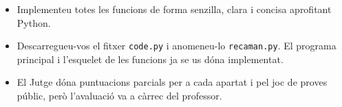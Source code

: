 \Observations

\begin{itemize}

\item Implementeu totes les funcions de forma senzilla, clara i concisa aprofitant Python.

\item Descarregueu-vos el fitxer \texttt{code.py} i anomeneu-lo \texttt{recaman.py}. El programa principal i l'esquelet de les funcions ja se us dóna implementat.

\item El Jutge dóna puntuacions parcials per a cada apartat i pel joc de proves públic, però l'avaluació va a càrrec del professor.

\end{itemize}


\Sample
